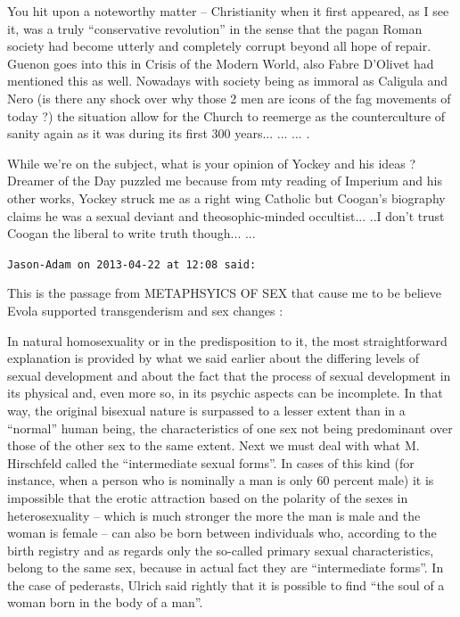 \begin{footnotesize}
\begin{sffamily}
You hit upon a noteworthy matter -- Christianity when it first appeared, as I see it, was a truly ``conservative revolution'' in the sense that the pagan Roman society had become utterly and completely corrupt beyond all hope of repair. Guenon goes into this in Crisis of the Modern World, also Fabre D'Olivet had mentioned this as well. Nowadays with society being as immoral as Caligula and Nero (is there any shock over why those 2 men are icons of the fag movements of today ?) the situation allow for the Church to reemerge as the counterculture of sanity again as it was during its first 300 years... ... ... .

While we're on the subject, what is your opinion of Yockey and his ideas ? Dreamer of the Day puzzled me because from mty reading of Imperium and his other works, Yockey struck me as a right wing Catholic but Coogan's biography claims he was a sexual deviant and theosophic-minded occultist... ..I don't trust Coogan the liberal to write truth though... ... 

\hfill

\texttt{Jason-Adam on 2013-04-22 at 12:08 said:}

This is the passage from METAPHSYICS OF SEX that cause me to be believe Evola supported transgenderism and sex changes :

In natural homosexuality or in the predisposition to it, the most straightforward explanation is provided by what we said earlier about the differing levels of sexual development and about the fact that the process of sexual development in its physical and, even more so, in its psychic aspects can be incomplete. In that way, the original bisexual nature is surpassed to a lesser extent than in a ``normal'' human being, the characteristics of one sex not being predominant over those of the other sex to the same extent. Next we must deal with what M. Hirschfeld called the ``intermediate sexual forms''. In cases of this kind (for instance, when a person who is nominally a man is only 60 percent male) it is impossible that the erotic attraction based on the polarity of the sexes in heterosexuality -- which is much stronger the more the man is male and the woman is female -- can also be born between individuals who, according to the birth registry and as regards only the so-called primary sexual characteristics, belong to the same sex, because in actual fact they are ``intermediate forms''. In the case of pederasts, Ulrich said rightly that it is possible to find ``the soul of a woman born in the body of a man''.


\end{sffamily}
\end{footnotesize}
